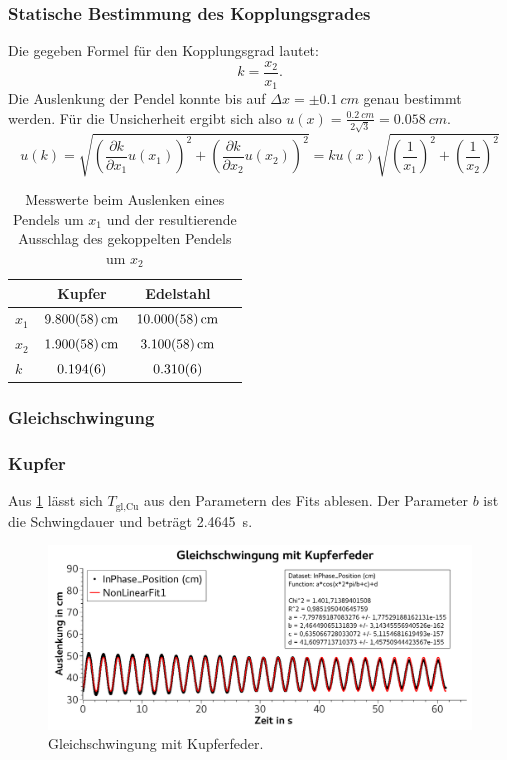 \documentclass[
	a4paper,
	12pt,
	pagesize,
	ngerman
]{scrartcl}
\begin{document}
	\subsubsection{Statische Bestimmung des Kopplungsgrades}
	Die gegeben Formel für den Kopplungsgrad lautet:
	\begin{equation}
		k = \frac{x_2}{x_1}.
	\end{equation}
	Die Auslenkung der Pendel konnte bis auf $\Delta x = \pm \SI{0,1}{cm}$ genau bestimmt werden.
	Für die Unsicherheit ergibt sich also $u(x) = \frac{\SI{0,2}{cm}}{2\sqrt{3}} = \SI{0,058}{cm}$.
	\begin{equation}
		u(k) = \sqrt{\left(\frac{\partial k}{\partial x_1}u(x_1)\right)^2+\left(\frac{\partial k}{\partial x_2}u(x_2)\right)^2} = k u(x) \sqrt{\left(\frac{1}{x_1}\right)^2+\left(\frac{1}{x_2}\right)^2}
	\end{equation}
	\begin{table}[H]
	\centering
	\begin{tabular}{ l | c | c | c |}
		& Kupfer & Edelstahl  \\ \hline
		$x_1 $ &$\SI{9,8 \pm 0,058}{cm}$&$\SI{10,0 \pm 0,058}{cm}$\\  
		$x_2 $ &$\SI{1,9 \pm 0,058}{cm}$&$\SI{3,1 \pm 0,058}{cm}$\\  \hline\hline
		$k$  & $\SI{0,194 \pm 0,006}{}$ &  $\SI{0,310 \pm 0,006}{}$ \\ \hline
	\end{tabular}
	\caption{Messwerte beim Auslenken eines Pendels um $x_1$ und der resultierende Ausschlag des gekoppelten Pendels um $x_2$}
		\label{TabelleStatischKopplungsgrad}
	\end{table}

	\subsubsection{Gleichschwingung}

	\subsubsection*{Kupfer}
	Aus \cref{KupferGleichschwingung} lässt sich $T_\text{gl,Cu}$ aus den Parametern des Fits ablesen. Der Parameter $b$ ist die Schwingdauer und beträgt \SI{2,4645}{s}.
	\begin{figure}[H]
		\includegraphics[width=1\textwidth]{KupferGleichschwingung}
		\centering
		\caption{Gleichschwingung mit Kupferfeder.}
		\label{KupferGleichschwingung}
		\centering
	\end{figure}
\end{document}
